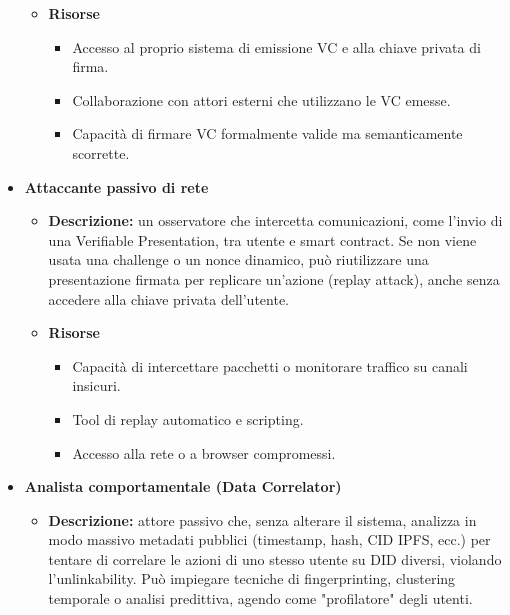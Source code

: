 \begin{itemize}
\begin{itemize}
                    \item \textbf{Risorse}
                        \begin{itemize}
                            \item Accesso al proprio sistema di emissione VC e alla chiave privata di firma.
                            
                            \item Collaborazione con attori esterni che utilizzano le VC emesse.
                            
                            \item Capacità di firmare VC formalmente valide ma semanticamente scorrette.
                        \end{itemize}
                \end{itemize}


            \item \textbf{Attaccante passivo di rete}
                \begin{itemize}
                    \item \textbf{Descrizione:} un osservatore che intercetta comunicazioni, come l'invio di una Verifiable Presentation, tra utente e smart contract. Se non viene usata una challenge o un nonce dinamico, può riutilizzare una presentazione firmata per replicare un'azione (replay attack), anche senza accedere alla chiave privata dell'utente.
                    
                    \item \textbf{Risorse}
                        \begin{itemize}
                            \item Capacità di intercettare pacchetti o monitorare traffico su canali insicuri.
                            
                            \item Tool di replay automatico e scripting.
                            
                            \item Accesso alla rete o a browser compromessi.
                        \end{itemize}
                \end{itemize}

            \item \textbf{Analista comportamentale (Data Correlator)}
                \begin{itemize}
                    \item \textbf{Descrizione:} attore passivo che, senza alterare il sistema, analizza in modo massivo metadati pubblici (timestamp, hash, CID IPFS, ecc.) per tentare di correlare le azioni di uno stesso utente su DID diversi, violando l’unlinkability. Può impiegare tecniche di fingerprinting, clustering temporale o analisi predittiva, agendo come "profilatore" degli utenti.
                    

\end{itemize}
\end{itemize}
